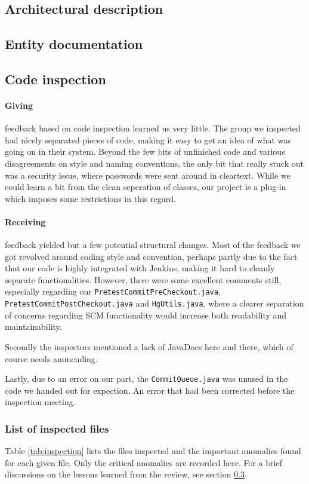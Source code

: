 \documentclass[a4paper]{article}
\begin{document}
\subsection{Architectural description}

\subsection{Entity documentation}

\subsection{Code inspection}
\label{sec:inspection}
\paragraph{Giving} feedback based on code inspection learned us very little. The
group we inspected had nicely separated pieces of code, making it easy to get an
idea of what was going on in their system. Beyond the few bits of unfinished code
and various disagreements on style and naming conventions, the only bit that
really stuck out was a security issue, where passwords were sent around in
cleartext. While we could learn a bit from the clean seperation of classes, our
project is a plug-in which imposes some restrictions in this regard.

\paragraph{Receiving} feedback yielded but a few potential structural changes. Most
of the feedback we got revolved around coding style and convention, perhaps
partly due to the fact that our code is highly integrated with Jenkins, making
it hard to cleanly separate functionalities. However, there were some excellent
comments still, especially regarding our \texttt{PretestCommitPreCheckout.java},
\texttt{PretestCommitPostCheckout.java} and \texttt{HgUtils.java}, where a
clearer separation of concerns regarding SCM functionality would increase both
readability and maintainability.

Secondly the inspectors mentioned a lack of JavaDocs here and there, which of
course needs ammending.

Lastly, due to an error on our part, the \texttt{CommitQueue.java} was unused in
the code we handed out for expection. An error that had been corrected before
the inspection meeting.

\subsubsection{List of inspected files}
Table \ref{tab:inspection} lists the files inspected and the important anomalies
found for each given file. Only the critical anomalies are recorded here. For a
brief discussions on the lessons learned from the review, see section
\ref{sec:inspection}.
\end{document}

